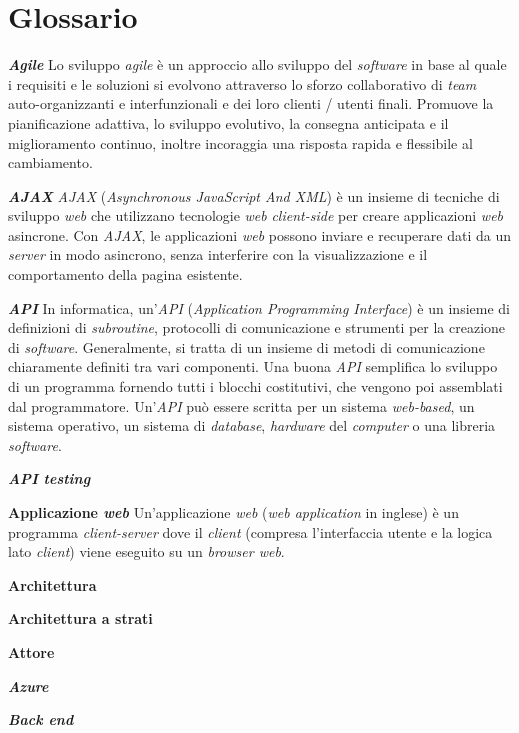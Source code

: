 \chapter{Glossario} \label{gloss}

\textbf{\textit{Agile}} Lo sviluppo \textit{agile} è un approccio allo sviluppo del \textit{software} in base al quale i requisiti e le soluzioni si evolvono attraverso lo sforzo collaborativo di \textit{team} auto-organizzanti e interfunzionali e dei loro clienti / utenti finali. Promuove la pianificazione adattiva, lo sviluppo evolutivo, la consegna anticipata e il miglioramento continuo, inoltre incoraggia una risposta rapida e flessibile al cambiamento.

\textbf{\textit{AJAX}} \textit{AJAX} (\textit{Asynchronous JavaScript And XML}) è un insieme di tecniche di sviluppo \textit{web} che utilizzano tecnologie \textit{web} \textit{client-side} per creare applicazioni \textit{web} asincrone. Con \textit{AJAX}, le applicazioni \textit{web} possono inviare e recuperare dati da un \textit{server} in modo asincrono, senza interferire con la visualizzazione e il comportamento della pagina esistente.

\textbf{\textit{API}} In informatica, un'\textit{API} (\textit{Application Programming Interface}) è un insieme di definizioni di \textit{subroutine}, protocolli di comunicazione e strumenti per la creazione di \textit{software}. Generalmente, si tratta di un insieme di metodi di comunicazione chiaramente definiti tra vari componenti. Una buona \textit{API} semplifica lo sviluppo di un programma fornendo tutti i blocchi costitutivi, che vengono poi assemblati dal programmatore. Un'\textit{API} può essere scritta per un sistema \textit{web-based}, un sistema operativo, un sistema di \textit{database}, \textit{hardware} del \textit{computer} o una libreria \textit{software}.

\textbf{\textit{API testing}}

\textbf{Applicazione \textit{web}} Un'applicazione \textit{web} (\textit{web application} in inglese) è un programma \textit{client-server} dove il \textit{client} (compresa l'interfaccia utente e la logica lato \textit{client}) viene eseguito su un \textit{browser web}.

\textbf{Architettura}

\textbf{Architettura a strati}

\textbf{Attore}

\textbf{\textit{Azure}}

\textbf{\textit{Back end}}

